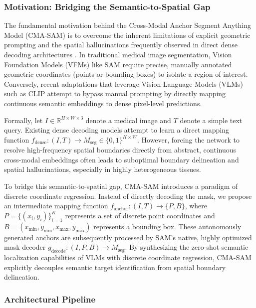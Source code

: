 \documentclass[onecolumn]{IEEEtran}
\numberwithin{equation}{section}
\theoremstyle{definition}
\theoremstyle{remark}
\begin{document}
\subsubsection{Motivation: Bridging the Semantic-to-Spatial Gap}

The fundamental motivation behind the Cross-Modal Anchor Segment Anything Model (CMA-SAM) is to overcome the inherent limitations of explicit geometric prompting \cite{kirillov2023segment, mazurowski2023segment} and the spatial hallucinations frequently observed in direct dense decoding architectures \cite{qian2024simplevilmedsam, koleilat2025medclip}. In traditional medical image segmentation, Vision Foundation Models (VFMs) like SAM require precise, manually annotated geometric coordinates (points or bounding boxes) to isolate a region of interest. Conversely, recent adaptations that leverage Vision-Language Models (VLMs) such as CLIP \cite{radford2021learning} attempt to bypass manual prompting by directly mapping continuous semantic embeddings to dense pixel-level predictions. 

Formally, let $I \in \mathbb{R}^{H \times W \times 3}$ denote a medical image and $T$ denote a simple text query. Existing dense decoding models attempt to learn a direct mapping function $f_{\text{dense}}: (I, T) \rightarrow M_{\text{seg}} \in \{0, 1\}^{H \times W}$. However, forcing the network to resolve high-frequency spatial boundaries directly from abstract, continuous cross-modal embeddings often leads to suboptimal boundary delineation and spatial hallucinations, especially in highly heterogeneous tissues.

To bridge this semantic-to-spatial gap, CMA-SAM introduces a paradigm of discrete coordinate regression. Instead of directly decoding the mask, we propose an intermediate mapping function $f_{\text{anchor}}: (I, T) \rightarrow \{P, B\}$, where $P = \{(x_i, y_i)\}_{i=1}^K$ represents a set of discrete point coordinates and $B = (x_{\min}, y_{\min}, x_{\max}, y_{\max})$ represents a bounding box. These autonomously generated anchors are subsequently processed by SAM's native, highly optimized mask decoder $g_{\text{decode}}: (I, P, B) \rightarrow M_{\text{seg}}$. By synthesizing the zero-shot semantic localization capabilities of VLMs with discrete coordinate regression, CMA-SAM explicitly decouples semantic target identification from spatial boundary delineation.

\subsubsection{Architectural Pipeline}
\end{document}
